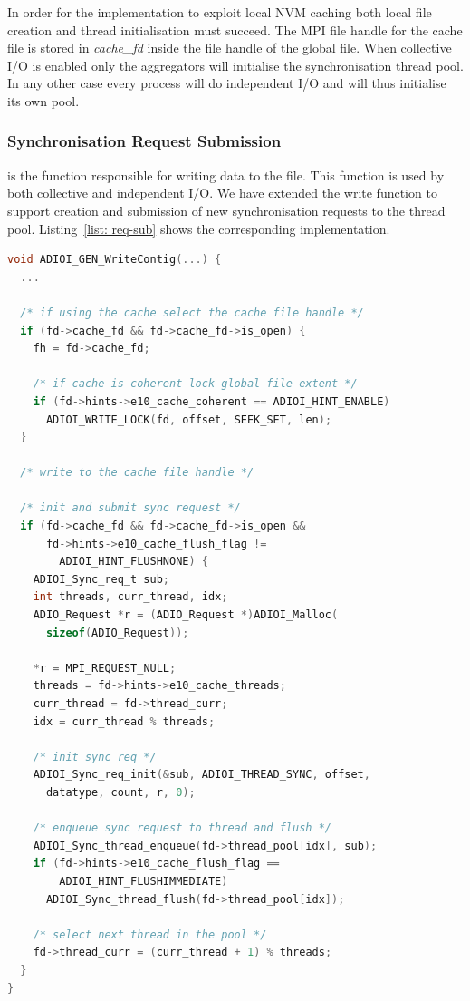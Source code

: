 In order for the implementation to exploit local NVM caching both local file creation and thread initialisation must succeed. The MPI file handle for the cache file is stored in \textit{cache\_fd} inside the file handle of the global file. 
When collective I/O is enabled only the aggregators will initialise the synchronisation thread pool. In any other case every process will do independent I/O and will thus initialise its own pool.

\subsubsection{Synchronisation Request Submission}
\label{subsubsec: sync-req-sub}
 is the function responsible for writing data to the file. This function is used by both collective and independent I/O. We have extended the write function to support creation and submission of new synchronisation 
requests to the thread pool. Listing~\ref{list: req-sub} shows the corresponding implementation.

\begin{lstlisting}[language=C, caption=Synchronisation Request Submission, label={list: req-sub}]
void ADIOI_GEN_WriteContig(...) {
  ...

  /* if using the cache select the cache file handle */
  if (fd->cache_fd && fd->cache_fd->is_open) {
    fh = fd->cache_fd;

    /* if cache is coherent lock global file extent */ 
    if (fd->hints->e10_cache_coherent == ADIOI_HINT_ENABLE)
      ADIOI_WRITE_LOCK(fd, offset, SEEK_SET, len);
  }

  /* write to the cache file handle */

  /* init and submit sync request */
  if (fd->cache_fd && fd->cache_fd->is_open && 
      fd->hints->e10_cache_flush_flag != 
        ADIOI_HINT_FLUSHNONE) {
    ADIOI_Sync_req_t sub;
    int threads, curr_thread, idx;
    ADIO_Request *r = (ADIO_Request *)ADIOI_Malloc(
      sizeof(ADIO_Request));

    *r = MPI_REQUEST_NULL;
    threads = fd->hints->e10_cache_threads;
    curr_thread = fd->thread_curr;
    idx = curr_thread % threads;

    /* init sync req */
    ADIOI_Sync_req_init(&sub, ADIOI_THREAD_SYNC, offset, 
      datatype, count, r, 0);

    /* enqueue sync request to thread and flush */
    ADIOI_Sync_thread_enqueue(fd->thread_pool[idx], sub);
    if (fd->hints->e10_cache_flush_flag == 
        ADIOI_HINT_FLUSHIMMEDIATE)
      ADIOI_Sync_thread_flush(fd->thread_pool[idx]);

    /* select next thread in the pool */
    fd->thread_curr = (curr_thread + 1) % threads;
  }
}
\end{lstlisting}

